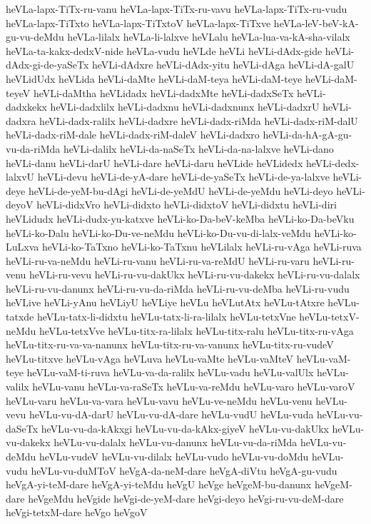 {heVLa-lapx-TiTx-ru-vanu
heVLa-lapx-TiTx-ru-vavu
heVLa-lapx-TiTx-ru-vudu
heVLa-lapx-TiTxto
heVLa-lapx-TiTxtoV
heVLa-lapx-TiTxve
heVLa-leV-beV-kA-gu-vu-deMdu
heVLa-lilalx
heVLa-li-lalxve
heVLalu
heVLa-lua-va-kA-sha-vilalx
heVLa-ta-kakx-dedxV-nide
heVLa-vudu
heVLde
heVLi
heVLi-dAdx-gide
heVLi-dAdx-gi-de-yaSeTx
heVLi-dAdxre
heVLi-dAdx-yitu
heVLi-dAga
heVLi-dA-galU
heVLidUdx
heVLida
heVLi-daMte
heVLi-daM-teya
heVLi-daM-teye
heVLi-daM-teyeV
heVLi-daMtha
heVLidadx
heVLi-dadxMte
heVLi-dadxSeTx
heVLi-dadxkekx
heVLi-dadxlilx
heVLi-dadxnu
heVLi-dadxnunx
heVLi-dadxrU
heVLi-dadxra
heVLi-dadx-ralilx
heVLi-dadxre
heVLi-dadx-riMda
heVLi-dadx-riM-dalU
heVLi-dadx-riM-dale
heVLi-dadx-riM-daleV
heVLi-dadxro
heVLi-da-hA-gA-gu-vu-da-riMda
heVLi-dalilx
heVLi-da-naSeTx
heVLi-da-na-lalxve
heVLi-dano
heVLi-danu
heVLi-darU
heVLi-dare
heVLi-daru
heVLide
heVLidedx
heVLi-dedx-lalxvU
heVLi-devu
heVLi-de-yA-dare
heVLi-de-yaSeTx
heVLi-de-ya-lalxve
heVLi-deye
heVLi-de-yeM-bu-dAgi
heVLi-de-yeMdU
heVLi-de-yeMdu
heVLi-deyo
heVLi-deyoV
heVLi-didxVro
heVLi-didxto
heVLi-didxtoV
heVLi-didxtu
heVLi-diri
heVLidudx
heVLi-dudx-yu-katxve
heVLi-ko-Da-beV-keMba
heVLi-ko-Da-beVku
heVLi-ko-Dalu
heVLi-ko-Du-ve-neMdu
heVLi-ko-Du-vu-di-lalx-veMdu
heVLi-ko-LuLxva
heVLi-ko-TaTxno
heVLi-ko-TaTxnu
heVLilalx
heVLi-ru-vAga
heVLi-ruva
heVLi-ru-va-neMdu
heVLi-ru-vanu
heVLi-ru-va-reMdU
heVLi-ru-varu
heVLi-ru-venu
heVLi-ru-vevu
heVLi-ru-vu-dakUkx
heVLi-ru-vu-dakekx
heVLi-ru-vu-dalalx
heVLi-ru-vu-danunx
heVLi-ru-vu-da-riMda
heVLi-ru-vu-deMba
heVLi-ru-vudu
heVLive
heVLi-yAnu
heVLiyU
heVLiye
heVLu
heVLutAtx
heVLu-tAtxre
heVLu-tatxde
heVLu-tatx-li-didxtu
heVLu-tatx-li-ra-lilalx
heVLu-tetxVne
heVLu-tetxV-neMdu
heVLu-tetxVve
heVLu-titx-ra-lilalx
heVLu-titx-ralu
heVLu-titx-ru-vAga
heVLu-titx-ru-va-va-nanunx
heVLu-titx-ru-va-vanunx
heVLu-titx-ru-vudeV
heVLu-titxve
heVLu-vAga
heVLuva
heVLu-vaMte
heVLu-vaMteV
heVLu-vaM-teye
heVLu-vaM-ti-ruva
heVLu-va-da-ralilx
heVLu-vadu
heVLu-valUlx
heVLu-valilx
heVLu-vanu
heVLu-va-raSeTx
heVLu-va-reMdu
heVLu-varo
heVLu-varoV
heVLu-varu
heVLu-va-vara
heVLu-vavu
heVLu-ve-neMdu
heVLu-venu
heVLu-vevu
heVLu-vu-dA-darU
heVLu-vu-dA-dare
heVLu-vudU
heVLu-vuda
heVLu-vu-daSeTx
heVLu-vu-da-kAkxgi
heVLu-vu-da-kAkx-giyeV
heVLu-vu-dakUkx
heVLu-vu-dakekx
heVLu-vu-dalalx
heVLu-vu-danunx
heVLu-vu-da-riMda
heVLu-vu-deMdu
heVLu-vudeV
heVLu-vu-dilalx
heVLu-vudo
heVLu-vu-doMdu
heVLu-vudu
heVLu-vu-duMToV
heVgA-da-neM-dare
heVgA-diVtu
heVgA-gu-vudu
heVgA-yi-teM-dare
heVgA-yi-teMdu
heVgU
heVge
heVgeM-bu-danunx
heVgeM-dare
heVgeMdu
heVgide
heVgi-de-yeM-dare
heVgi-deyo
heVgi-ru-vu-deM-dare
heVgi-tetxM-dare
heVgo
heVgoV
}

